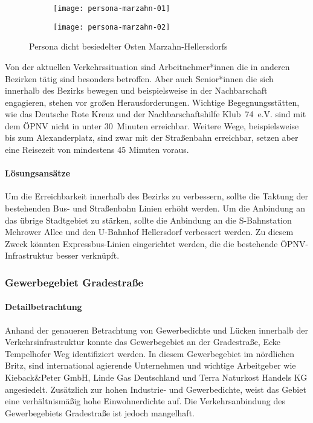 \begin{figure}
    \centering
    \begin{subfigure}{.5\textwidth}
        \centering
        \texttt{[image: persona-marzahn-01]}
    \end{subfigure}%
    \begin{subfigure}{.5\textwidth}
        \centering
        \texttt{[image: persona-marzahn-02]}
    \end{subfigure}
    \caption{Persona dicht besiedelter Osten Marzahn-Hellersdorfs}
    \label{persona-marzahn-hellersdorf}
\end{figure}

Von der aktuellen Verkehrssituation sind Arbeitnehmer*innen die in anderen Bezirken tätig sind besonders betroffen. Aber auch Senior*innen die sich innerhalb des Bezirks bewegen und beispielsweise in der Nachbarschaft engagieren, stehen vor großen Herausforderungen. Wichtige Begegnungsstätten, wie das Deutsche Rote Kreuz und der Nachbarschaftshilfe Klub~74~e.V. sind mit dem ÖPNV nicht in unter 30~Minuten erreichbar. Weitere Wege, beispielsweise bis zum Alexanderplatz, sind zwar mit der Straßenbahn erreichbar, setzen aber eine Reisezeit von mindestens 45 Minuten voraus.

\paragraph{Lösungsansätze}

Um die Erreichbarkeit innerhalb des Bezirks zu verbessern, sollte die Taktung der bestehenden Bus- und Straßenbahn Linien erhöht werden. Um die Anbindung an das übrige Stadtgebiet zu stärken, sollte die Anbindung an die S-Bahnstation Mehrower Allee und den U-Bahnhof Hellersdorf verbessert werden. Zu diesem Zweck könnten Expressbus-Linien eingerichtet werden, die die bestehende ÖPNV-Infrastruktur besser verknüpft.

\subsubsection{Gewerbegebiet Gradestraße}

\paragraph{Detailbetrachtung}

Anhand der genaueren Betrachtung von Gewerbedichte und Lücken innerhalb der Verkehrsinfrastruktur konnte das Gewerbegebiet an der Gradestraße, Ecke Tempelhofer Weg identifiziert werden. In diesem Gewerbegebiet im nördlichen Britz, sind international agierende Unternehmen und wichtige Arbeitgeber wie Kieback\&Peter GmbH, Linde Gas Deutschland und Terra Naturkost Handels KG angesiedelt. Zusätzlich zur hohen Industrie- und Gewerbedichte, weist das Gebiet eine verhältnismäßig hohe Einwohnerdichte auf. Die Verkehrsanbindung des Gewerbegebiets Gradestraße ist jedoch mangelhaft.

